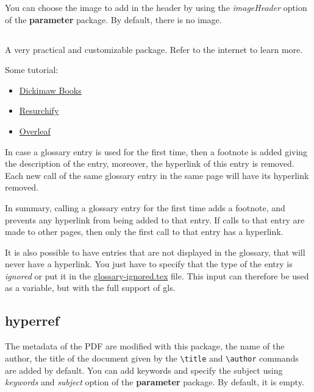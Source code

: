 \documentclass[a4paper, 11pt]{article}
\begin{document}
You can choose the image to add in the header by using the \textit{imageHeader} option of the \textbf{\gls{parameter}} package.
By default, there is no image.

\subsection{}

A very practical and customizable package. Refer to the internet to learn more.\newline

Some tutorial:
\begin{itemize}
    \item \href{https://www.dickimaw-books.com/latex/thesis/html/makeglossaries.html}{Dickimaw Books}
    \item \href{https://www.resurchify.com/latex_tutorial/latex_glossaries.php}{Resurchify}
    \item \href{https://fr.overleaf.com/learn/latex/Glossaries}{Overleaf}
\end{itemize}

In case a glossary entry is used for the first time, then a footnote is added giving the description of the entry,
moreover, the hyperlink of this entry is removed.
Each new call of the same glossary entry in the same page will have its hyperlink removed.\newline

In summary, calling a glossary entry for the first time adds a footnote, and prevents any hyperlink from being
added to that entry. If calls to that entry are made to other pages, then only the first call to that entry has a hyperlink.\newline

It is also possible to have entries that are not displayed in the glossary, that will never have a hyperlink.
You just have to specify that the type of the entry is \textit{ignored} or put it in the \underline{glossary-ignored.tex} file.
This input can therefore be used as a variable, but with the full support of \gls{gls}.

\subsection{hyperref}

The metadata of the PDF are modified with this package, the name of the author, the title of the document given
by the \verb=\title= and \verb=\author= commands are added by default. You can add keywords and specify the subject using
\textit{keywords} and \textit{subject} option of the \textbf{\gls{parameter}} package. By default, it is empty.
\end{document}
